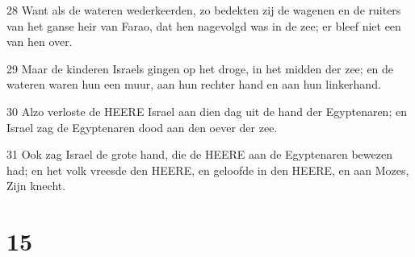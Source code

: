 \par 28 Want als de wateren wederkeerden, zo bedekten zij de wagenen en de ruiters van het ganse heir van Farao, dat hen nagevolgd was in de zee; er bleef niet een van hen over.
\par 29 Maar de kinderen Israels gingen op het droge, in het midden der zee; en de wateren waren hun een muur, aan hun rechter hand en aan hun linkerhand.
\par 30 Alzo verloste de HEERE Israel aan dien dag uit de hand der Egyptenaren; en Israel zag de Egyptenaren dood aan den oever der zee.
\par 31 Ook zag Israel de grote hand, die de HEERE aan de Egyptenaren bewezen had; en het volk vreesde den HEERE, en geloofde in den HEERE, en aan Mozes, Zijn knecht.

\chapter{15}

